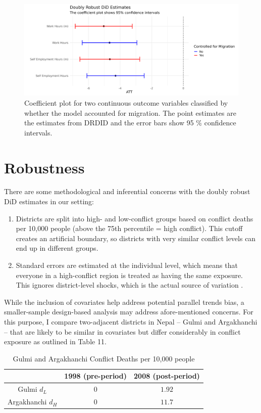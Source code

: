 \documentclass[12pt,a4paper]{article}
\providecommand{\tabularnewline}{\\}
\begin{document}
\begin{figure}[H]
	\centering
	\includegraphics[width=1\textwidth]{../Analysis files/coefplot_2.jpg}
	\caption{Coefficient plot for two continuous outcome variables classified by whether the model accounted for migration. The point estimates are the estimates from DRDID and the error bars show 95 \% confidence intervals.}
	\label{fig:coefplot_1_2}
\end{figure}

\section{Robustness}
There are some methodological and inferential concerns with the doubly robust DiD estimates in our setting:

\begin{enumerate}
	\item Districts are split into high- and low-conflict groups based on conflict deaths per 10,000 people (above the 75th percentile = high conflict). This cutoff creates an artificial boundary, so districts with very similar conflict levels can end up in different groups.
	\item Standard errors are estimated at the individual level, which means that everyone in a high-conflict region is treated as having the same exposure. This ignores district-level shocks, which is the actual source of variation \parencite{bertrand2004much}.
\end{enumerate}
While the inclusion of covariates help address potential parallel trends bias, a smaller-sample design-based analysis may address afore-mentioned concerns. For this purpose, I compare two-adjacent districts in Nepal -- Gulmi and Argakhanchi -- that are likely to be similar in covariates but differ considerably in conflict exposure as outlined in Table 11.

\begin{table}[H]
	\caption{Gulmi and Argakhanchi Conflict Deaths per 10,000 people}
	
	\renewcommand{\arraystretch}{1.2}
	\vspace{1em}
	\centering{}%
	\begin{tabular}{c|c|c}
		& 1998 (pre-period) & 2008 (post-period)\tabularnewline
		\hline 
		Gulmi $d_{L}$ & $0$ & $1.92$\tabularnewline
		Argakhanchi $d_{H}$ & $0$ & $11.7$\tabularnewline
		\hline 
	\end{tabular}
\end{table}
\end{document}
